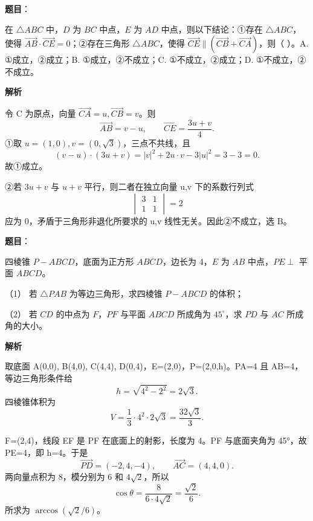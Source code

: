 \begin{answer}

\textbf{题目}：

在 $\triangle ABC$ 中，$D$ 为 $BC$ 中点，$E$ 为 $AD$ 中点，则以下结论：①存在 $\triangle ABC$，使得 $\overrightarrow{AB}\cdot\overrightarrow{CE}=0$；②存在三角形 $\triangle ABC$，使得 $\overrightarrow{CE}\parallel(\overrightarrow{CB}+\overrightarrow{CA})$，则（ ）。A. ①成立，②成立；B. ①成立，②不成立；C. ①不成立，②成立；D. ①不成立，②不成立。

\textbf{解析}

令 C 为原点，向量 \(\overrightarrow{CA}=u,\overrightarrow{CB}=v\)。则
\nopagebreak[4]
\[
\overrightarrow{AB}=v-u,\qquad
\overrightarrow{CE}=\frac{3u+v}{4}.
\]
①取 \(u=(1,0),v=(0,\sqrt3)\)，三点不共线，且
\nopagebreak[4]
\[
(v-u)\cdot(3u+v)=|v|^2+2u\cdot v-3|u|^2=3-3=0.
\]
故①成立。

②若 \(3u+v\) 与 \(u+v\) 平行，则二者在独立向量 u,v 下的系数行列式
\nopagebreak[4]
\[
\begin{vmatrix}3&1\\1&1\end{vmatrix}=2
\]
应为 0，矛盾于三角形非退化所要求的 u,v 线性无关。因此②不成立，选 B。


\end{answer}
\begin{answer}

\textbf{题目}：

四棱锥 $P-ABCD$，底面为正方形 $ABCD$，边长为 4，$E$ 为 $AB$ 中点，$PE\perp$ 平面 $ABCD$。

（1） 若 $\triangle PAB$ 为等边三角形，求四棱锥 $P-ABCD$ 的体积；

（2） 若 $CD$ 的中点为 $F$，$PF$ 与平面 $ABCD$ 所成角为 $45^\circ$，求 $PD$ 与 $AC$ 所成角的大小。
\nopagebreak[4]
\begin{center}\end{center}
\nopagebreak[4]
\textbf{解析}


取底面 A(0,0), B(4,0), C(4,4), D(0,4)，E=(2,0)，P=(2,0,h)。PA=4 且 AB=4，等边三角形条件给
\nopagebreak[4]
\[
h=\sqrt{4^2-2^2}=2\sqrt3.
\]
四棱锥体积为
\nopagebreak[4]
\[
V=\frac13\cdot 4^2\cdot2\sqrt3=\frac{32\sqrt3}{3}.
\]


F=(2,4)，线段 EF 是 PF 在底面上的射影，长度为 4。PF 与底面夹角为 45°，故 PE=4，即 h=4。于是
\nopagebreak[4]
\[
\overrightarrow{PD}=(-2,4,-4),\qquad \overrightarrow{AC}=(4,4,0).
\]
两向量点积为 8，模分别为 6 和 \(4\sqrt2\)，所以
\nopagebreak[4]
\[
\cos\theta=\frac{8}{6\cdot4\sqrt2}=\frac{\sqrt2}{6}.
\]
所求为 \(\arccos(\sqrt2/6)\)。



\end{answer}
